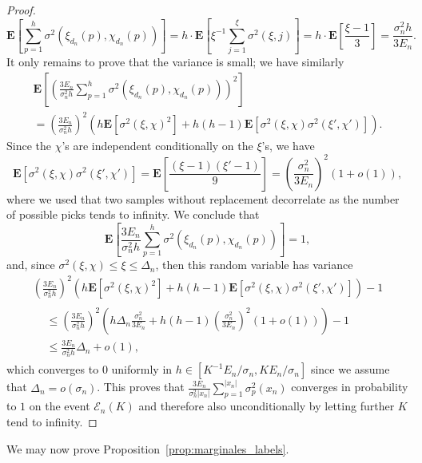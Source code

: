 \documentclass[AHL,Unicode,longabstracts,published]{cedram}
\newcommand{\ensembles}[1]{\mathbf{#1}}
\newcommand{\E}{\ensembles{E}}
\newcommand{\Es}[1]{\E\left[#1\right]}
\newcommand{\1}{\ensembles{1}}
\renewcommand{\le}{\leqslant}
\newcommand{\clE}{\mathcal{E}}
\newcommand{\edges}{E}
\begin{document}
\begin{proof}
\[
\Es{\sum_{p = 1}^h \sigma^2\left(\xi_{d_n}(p), \chi_{d_n}(p)\right)} = h \cdot \Es{\xi^{-1} \sum_{j=1}^\xi \sigma^2(\xi,j)} = h \cdot \Es{\frac{\xi-1}{3}} = \frac{\sigma_n^2 h}{3 \edges_n}.
\]
It only remains to prove that the variance is small; we have similarly
\begin{multline*}
\Es{\left(\frac{3 \edges_n}{\sigma_n^2 h} \sum_{p = 1}^h \sigma^2\left(\xi_{d_n}(p), \chi_{d_n}(p)\right)\right)^2}
\\=\left(\frac{3 \edges_n}{\sigma_n^2 h}\right)^2 \left(h \Es{\sigma^2(\xi, \chi)^2} + h(h-1) \Es{\sigma^2(\xi, \chi) \sigma^2\left(\xi', \chi'\right)}\right).
\end{multline*}
Since the $\chi$'s are independent conditionally on the $\xi$'s, we have
\[
\Es{\sigma^2(\xi, \chi) \sigma^2\left(\xi', \chi'\right)} = \Es{\frac{(\xi-1)\left(\xi'-1\right)}{9}} = \left(\frac{\sigma_n^2}{3 \edges_n}\right)^2 (1+o(1)),
\]
where we used that two samples without replacement decorrelate as the number of possible picks tends to infinity. We conclude that
\[
\Es{\frac{3 \edges_n}{\sigma_n^2 h} \sum_{p = 1}^h \sigma^2\left(\xi_{d_n}(p), \chi_{d_n}(p)\right)} = 1,
\]
and, since $\sigma^2(\xi, \chi) \le \xi \le \Delta_n$, then this random variable has variance
\begin{multline*}
\left(\frac{3 \edges_n}{\sigma_n^2 h}\right)^2 \left(h \Es{\sigma^2(\xi, \chi)^2} + h(h-1) \Es{\sigma^2(\xi, \chi) \sigma^2\left(\xi', \chi'\right)}\right) - 1
\\
\begin{aligned}
&\le \left(\frac{3 \edges_n}{\sigma_n^2 h}\right)^2 \left(h \Delta_n \frac{\sigma_n^2}{3 \edges_n} + h(h-1) \left(\frac{\sigma_n^2}{3 \edges_n}\right)^2 (1+o(1))\right) - 1
\\
&\le \frac{3 \edges_n}{\sigma_n^2 h} \Delta_n + o(1),
\end{aligned}
\end{multline*}
which converges to $0$ uniformly in $h \in [K^{-1} \edges_n / \sigma_n, K \edges_n / \sigma_n]$ since we assume that $\Delta_n = o(\sigma_n)$. This proves that $\tfrac{3 \edges_n}{\sigma_n^2 |x_n|} \sum_{p = 1}^{|x_n|} \sigma^2_p(x_n)$ converges in probability to $1$ on the event $\clE_n(K)$ and therefore also unconditionally by letting further $K$ tend to infinity.
\end{proof}



We may now prove Proposition~\ref{prop:marginales_labels}.
\end{document}
